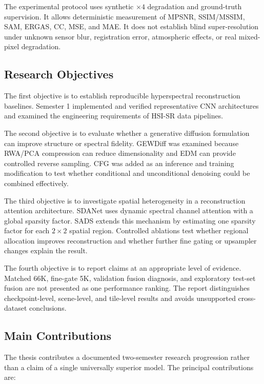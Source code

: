 \documentclass[10pt,twocolumn,letterpaper]{article}
\begin{document}
The experimental protocol uses synthetic $\times4$ degradation and ground-truth supervision. It allows deterministic measurement of MPSNR, SSIM/MSSIM, SAM, ERGAS, CC, MSE, and MAE. It does not establish blind super-resolution under unknown sensor blur, registration error, atmospheric effects, or real mixed-pixel degradation.

\subsection{Research Objectives}

The first objective is to establish reproducible hyperspectral reconstruction baselines. Semester 1 implemented and verified representative CNN architectures and examined the engineering requirements of HSI-SR data pipelines.

The second objective is to evaluate whether a generative diffusion formulation can improve structure or spectral fidelity. GEWDiff was examined because RWA/PCA compression can reduce dimensionality and EDM can provide controlled reverse sampling. CFG was added as an inference and training modification to test whether conditional and unconditional denoising could be combined effectively.

The third objective is to investigate spatial heterogeneity in a reconstruction attention architecture. SDANet uses dynamic spectral channel attention with a global sparsity factor. SADS extends this mechanism by estimating one sparsity factor for each $2\times2$ spatial region. Controlled ablations test whether regional allocation improves reconstruction and whether further fine gating or upsampler changes explain the result.

The fourth objective is to report claims at an appropriate level of evidence. Matched 66K, fine-gate 5K, validation fusion diagnosis, and exploratory test-set fusion are not presented as one performance ranking. The report distinguishes checkpoint-level, scene-level, and tile-level results and avoids unsupported cross-dataset conclusions.

\subsection{Main Contributions}

The thesis contributes a documented two-semester research progression rather than a claim of a single universally superior model. The principal contributions are:
\end{document}
